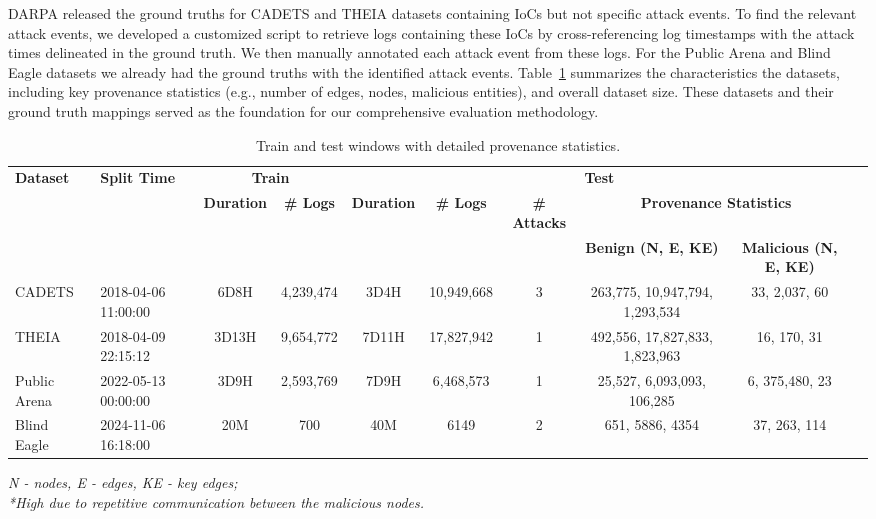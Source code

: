DARPA released the ground truths for CADETS and THEIA datasets containing IoCs but not specific attack events. 
To find the relevant attack events, we developed a customized script to retrieve logs containing these IoCs by cross-referencing log timestamps with the attack times delineated in the ground truth. 
We then manually annotated each attack event from these logs. 
For the Public Arena and Blind Eagle datasets we already had the ground truths with the identified attack events.
Table~\ref{tab:train_test} summarizes the characteristics the datasets, including key provenance statistics (e.g., number of edges, nodes, malicious entities), and overall dataset size. 
These datasets and their ground truth mappings served as the foundation for our comprehensive evaluation methodology. 


\begin{table}[!ht]
\centering
\caption{Train and test windows with detailed provenance statistics.}

\begin{adjustbox}{width=1.0\textwidth,center=\textwidth}
\begin{tabular}{|l|l|c|c|c|c|c|c|c|c|}
\hline
\multirow{2}{*}{\textbf{Dataset}} & \multirow{2}{*}{\textbf{Split Time}} & \multicolumn{2}{c|}{\textbf{Train}} & \multicolumn{5}{c|}{\textbf{Test}} \\
\cline{3-9}
 &  & \textbf{Duration} & \textbf{\# Logs} & \textbf{Duration} & \textbf{\# Logs} & \textbf{\# Attacks} & \multicolumn{2}{c|}{\textbf{Provenance Statistics}} \\
\cline{8-9}
 & & & & & & & \textbf{Benign (N, E, KE)} & \textbf{Malicious (N, E, KE)} \\
\hline
CADETS & 2018-04-06 11:00:00 & 6D8H & 4,239,474 & 3D4H & 10,949,668 & 3 & 263,775, 10,947,794, 1,293,534 & 33, 2,037, 60 \\

THEIA & 2018-04-09 22:15:12 & 3D13H & 9,654,772 & 7D11H & 17,827,942 & 1 & 492,556, 17,827,833, 1,823,963 & 16, 170, 31 \\

Public Arena & 2022-05-13 00:00:00 & 3D9H & 2,593,769 & 7D9H & 6,468,573 & 1 & 25,527, 6,093,093, 106,285 & 6, 375,480, 23 \\

Blind Eagle & 2024-11-06 16:18:00 & 20M & 700 & 40M & 6149 & 2 & 651, 5886, 4354 & 37, 263, 114 \\
\hline
\end{tabular}
\end{adjustbox}
\textit{N - nodes, E - edges, KE - key edges;} \\
\textit{*High due to repetitive communication between the malicious nodes.}

\label{tab:train_test}
\end{table}

